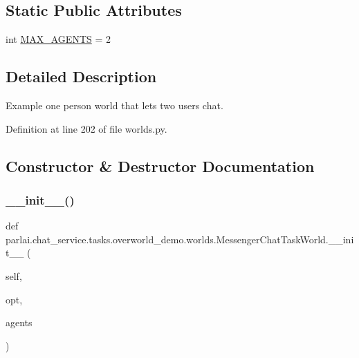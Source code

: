 \subsection*{Static Public Attributes}
\begin{DoxyCompactItemize}
\item 
int \hyperlink{classparlai_1_1chat__service_1_1tasks_1_1overworld__demo_1_1worlds_1_1MessengerChatTaskWorld_a8533513101dafbd8a6b980d6f10b8711}{M\+A\+X\+\_\+\+A\+G\+E\+N\+TS} = 2
\end{DoxyCompactItemize}


\subsection{Detailed Description}
\begin{DoxyVerb}Example one person world that lets two users chat.
\end{DoxyVerb}
 

Definition at line 202 of file worlds.\+py.



\subsection{Constructor \& Destructor Documentation}
\mbox{\label{classparlai_1_1chat__service_1_1tasks_1_1overworld__demo_1_1worlds_1_1MessengerChatTaskWorld_a4092cb3b80c2af7884b5368db1803433}} 
\subsubsection{\texorpdfstring{\+\_\+\+\_\+init\+\_\+\+\_\+()}{\_\_init\_\_()}}
{\footnotesize\ttfamily def parlai.\+chat\+\_\+service.\+tasks.\+overworld\+\_\+demo.\+worlds.\+Messenger\+Chat\+Task\+World.\+\_\+\+\_\+init\+\_\+\+\_\+ (\begin{DoxyParamCaption}\item[{}]{self,  }\item[{}]{opt,  }\item[{}]{agents }\end{DoxyParamCaption})}




